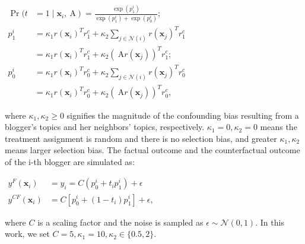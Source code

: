 \begin{center}
$
\begin{aligned}
\operatorname{Pr}(t&\left.=1 \mid \mathbf{x}_i, \mathrm{~A}\right)=\frac{\exp \left(p_1^i\right)}{\exp \left(p_1^i\right)+\exp \left(p_0^i\right)} ; \\
p_1^i &=\kappa_1 r\left(\mathbf{x}_i\right)^T r_1^c+\kappa_2 \sum_{j \in \mathcal{N}(i)} r\left(\mathbf{x}_j\right)^T r_1^c \\
&=\kappa_1 r\left(\mathbf{x}_i\right)^T r_1^c+\kappa_2\left(\mathrm{~A} r\left(\mathbf{x}_j\right)\right)^T r_1^c ; \\
p_0^i &=\kappa_1 r\left(\mathbf{x}_i\right)^T r_0^c+\kappa_2 \sum_{j \in \mathcal{N}(i)} r\left(\mathbf{x}_j\right)^T r_0^c \\
&=\kappa_1 r\left(\mathbf{x}_i\right)^T r_0^c+\kappa_2\left(\mathrm{~A} r\left(\mathbf{x}_j\right)\right)^T r_0^c,
\end{aligned}
$
\end{center}

where $\kappa_1, \kappa_2 \geq 0$ signifies the magnitude of the confounding bias resulting from a blogger’s topics and her neighbors’ topics, respectively.  $\kappa_1 = 0, \kappa_2 = 0$ means
the treatment assignment is random and there is no selection bias,
and greater $\kappa_1, \kappa_2$ means larger selection bias. The factual outcome and the counterfactual outcome of the i-th blogger are simulated as:

\begin{center}
$
\begin{aligned}
y^F\left(\mathbf{x}_i\right) &=y_i=C\left(p_0^i+t_i p_1^i\right)+\epsilon \\
y^{C F}\left(\mathbf{x}_i\right) &=C\left[p_0^i+\left(1-t_i\right) p_1^i\right]+\epsilon,
\end{aligned}
$
\end{center}
where $C$ is a scaling factor and the noise is sampled as $\epsilon \sim \mathcal{N}(0,1)$. In this work, we set $C=5, \kappa_1=10, \kappa_2 \in\{0.5,2\}$.


